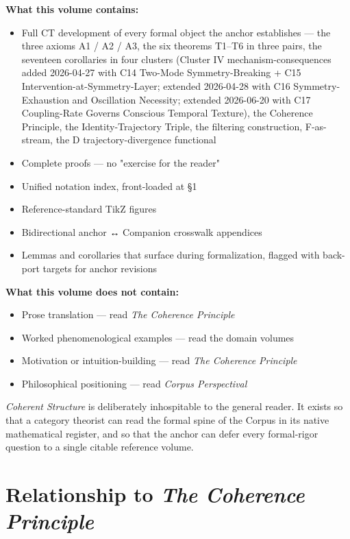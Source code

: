 \documentclass[11pt, openany]{book}
\newcommand{\sectionbreak}{\clearpage}
\begin{document}
\textbf{What this volume contains:}

\begin{itemize}
\item Full CT development of every formal object the anchor establishes --- the three axioms A1 / A2 / A3, the six theorems T1–T6 in three pairs, the seventeen corollaries in four clusters (Cluster IV mechanism-consequences added 2026-04-27 with C14 Two-Mode Symmetry-Breaking + C15 Intervention-at-Symmetry-Layer; extended 2026-04-28 with C16 Symmetry-Exhaustion and Oscillation Necessity; extended 2026-06-20 with C17 Coupling-Rate Governs Conscious Temporal Texture), the Coherence Principle, the Identity-Trajectory Triple, the filtering construction, F-as-stream, the D trajectory-divergence functional
\item Complete proofs --- no "exercise for the reader"
\item Unified notation index, front-loaded at §1
\item Reference-standard TikZ figures
\item Bidirectional anchor ↔ Companion crosswalk appendices
\item Lemmas and corollaries that surface during formalization, flagged with back-port targets for anchor revisions
\end{itemize}

\textbf{What this volume does not contain:}

\begin{itemize}
\item Prose translation --- read \textit{The Coherence Principle}
\item Worked phenomenological examples --- read the domain volumes
\item Motivation or intuition-building --- read \textit{The Coherence Principle}
\item Philosophical positioning --- read \textit{Corpus Perspectival}
\end{itemize}

\textit{Coherent Structure} is deliberately inhospitable to the general reader. It exists so that a category theorist can read the formal spine of the Corpus in its native mathematical register, and so that the anchor can defer every formal-rigor question to a single citable reference volume.

\sectionbreak

\section{Relationship to \textit{The Coherence Principle}}
\end{document}
